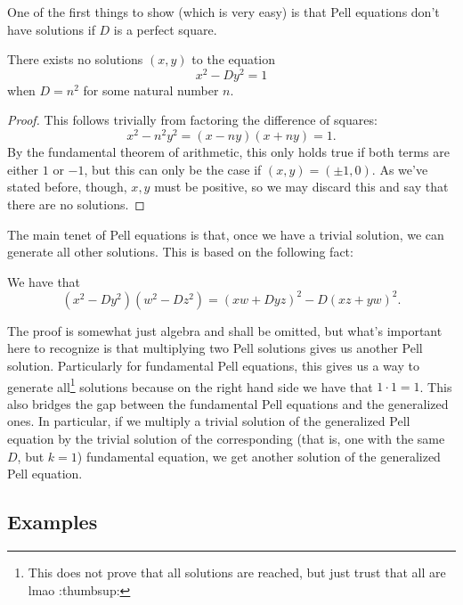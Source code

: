 \documentclass[a5paper]{article}
\begin{document}
One of the first things to show (which is very easy) is that Pell equations
don't have solutions if \( D \) is a perfect square.
\begin{chirpbox}
    \begin{theorem}
        There exists no solutions \( (x, y) \) to the equation
        \[
            x^2 - Dy^2 = 1
        \]
        when \( D = n^2 \) for some natural number \( n \).
    \end{theorem}
\end{chirpbox}
\begin{proof}
    This follows trivially from factoring the difference of squares:
    \[
        x^2 - n^2 y^2 = (x - ny)(x + ny) = 1
    .\]
    By the fundamental theorem of arithmetic, this only holds true if both
    terms are either \( 1 \) or \( -1 \), but this can only be the case if \(
    (x, y) = (\pm1, 0) \). As we've stated before, though, \( x,y \) must be
    positive, so we may discard this and say that there are no solutions.
\end{proof}
The main tenet of Pell equations is that, once we have a trivial solution, we
can generate all other solutions. This is based on the following fact:
\begin{chirpbox}
    \begin{theorem}
        We have that
        \[
            (x^2 - D y^2)(w^2 - Dz^2) = (xw + Dyz)^2 - D(xz + yw)^2
        .\]
    \end{theorem}
\end{chirpbox}
The proof is somewhat just algebra and shall be omitted, but what's important
here to recognize is that multiplying two Pell solutions gives us another Pell
solution. Particularly for fundamental Pell equations, this gives us a way to
generate all\footnote{This does not prove that all solutions are reached, but
just trust that all are lmao :thumbsup:} solutions because on the right hand
side we have that \( 1 \cdot 1 = 1 \). This also bridges the gap between the
fundamental Pell equations and the generalized ones. In particular, if we
multiply a trivial solution of the generalized Pell equation by the trivial
solution of the corresponding (that is, one with the same \( D \), but \( k = 1
\)) fundamental equation, we get another solution of the generalized Pell
equation.

\subsection*{Examples}
\end{document}
